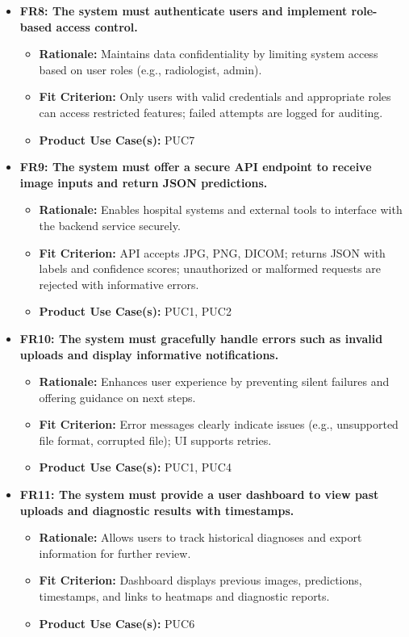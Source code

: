 \documentclass[12pt]{article}
\begin{document}
\begin{itemize}
    \item \textbf{FR8: The system must authenticate users and implement role-based access control.}
    \begin{itemize}
        \item \textbf{Rationale:} Maintains data confidentiality by limiting system access based on user roles (e.g., radiologist, admin).
        \item \textbf{Fit Criterion:} Only users with valid credentials and appropriate roles can access restricted features; failed attempts are logged for auditing.
        \item \textbf{Product Use Case(s):} PUC7
    \end{itemize}

    \item \textbf{FR9: The system must offer a secure API endpoint to receive image inputs and return JSON predictions.}
    \begin{itemize}
        \item \textbf{Rationale:} Enables hospital systems and external tools to interface with the backend service securely.
        \item \textbf{Fit Criterion:} API accepts JPG, PNG, DICOM\cite{dicom}; returns JSON with labels and confidence scores; unauthorized or malformed requests are rejected with informative errors.
        \item \textbf{Product Use Case(s):} PUC1, PUC2
    \end{itemize}

    \item \textbf{FR10: The system must gracefully handle errors such as invalid uploads and display informative notifications.}
    \begin{itemize}
        \item \textbf{Rationale:} Enhances user experience by preventing silent failures and offering guidance on next steps.
        \item \textbf{Fit Criterion:} Error messages clearly indicate issues (e.g., unsupported file format, corrupted file); UI supports retries.
        \item \textbf{Product Use Case(s):} PUC1, PUC4
    \end{itemize}

    \item \textbf{FR11: The system must provide a user dashboard to view past uploads and diagnostic results with timestamps.}
    \begin{itemize}
        \item \textbf{Rationale:} Allows users to track historical diagnoses and export information for further review.
        \item \textbf{Fit Criterion:} Dashboard displays previous images, predictions, timestamps, and links to heatmaps and diagnostic reports.
        \item \textbf{Product Use Case(s):} PUC6
    \end{itemize}


\end{itemize}
\end{document}
